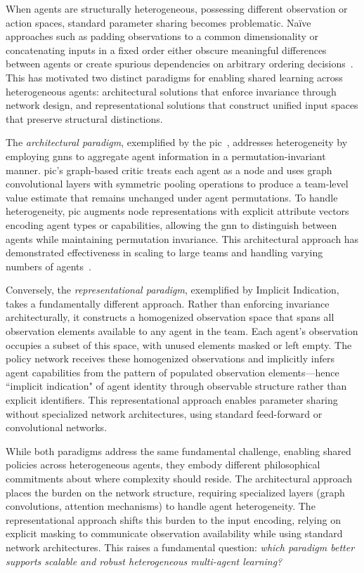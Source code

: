 \documentclass[conference]{IEEEtran}
\begin{document}
When agents are structurally heterogeneous, possessing different observation or 
action spaces, standard parameter sharing becomes problematic. 
Na\"ive approaches such as padding observations to a common dimensionality or 
concatenating inputs in a fixed order either obscure meaningful differences 
between agents or create spurious dependencies on arbitrary ordering decisions~\cite{terry2020}. 
This has motivated two distinct paradigms for enabling shared learning across heterogeneous 
agents: architectural solutions that enforce invariance through network design, and 
representational solutions that construct unified input spaces that preserve 
structural distinctions.

The \emph{architectural paradigm}, exemplified by the \gls{pic}~\cite{liu2020b}, 
addresses heterogeneity by employing \glspl{gnn} to aggregate agent 
information in a permutation-invariant manner. \Gls{pic}'s graph-based critic treats each 
agent as a node and uses graph convolutional layers with symmetric pooling operations 
to produce a team-level value estimate that remains unchanged under agent permutations. 
To handle heterogeneity, \gls{pic} augments node representations with explicit attribute 
vectors encoding agent types or capabilities, allowing the \gls{gnn} to distinguish between 
agents while maintaining permutation invariance. 
This architectural approach has demonstrated effectiveness in scaling to large teams 
and handling varying numbers of agents~\cite{liu2020b}.

Conversely, the \emph{representational paradigm}, exemplified by Implicit Indication,%
takes a fundamentally different approach. Rather than enforcing invariance architecturally, 
it constructs a homogenized observation space that spans all observation elements available 
to any agent in the team. Each agent's observation occupies a subset of this space, 
with unused elements masked or left empty. The policy network receives these homogenized 
observations and implicitly infers agent capabilities from the pattern of populated 
observation elements—hence ``implicit indication" of agent identity through observable 
structure rather than explicit identifiers. 
This representational approach enables parameter sharing without specialized 
network architectures, using standard feed-forward or convolutional networks.

While both paradigms address the same fundamental challenge, 
enabling shared policies across heterogeneous agents, 
they embody different philosophical commitments about 
where complexity should reside. 
The architectural approach places the burden on the network structure, 
requiring specialized layers (graph convolutions, attention mechanisms) 
to handle agent heterogeneity. 
The representational approach shifts this burden to the input encoding, 
relying on explicit masking to communicate observation availability 
while using standard network architectures. 
This raises a fundamental question: \textit{which paradigm better 
supports scalable and robust heterogeneous multi-agent learning?}
\end{document}
